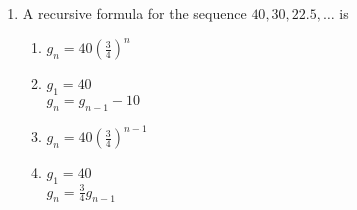 \documentclass[12pt, twoside]{article}
\begin{document}
\begin{enumerate}[itemsep=0.5cm]
\item A recursive formula for the sequence $40, 30, 22.5, \ldots$ is
\begin{enumerate}
    \item $g_n = 40 \left( \frac{3}{4} \right)^n$
    \item $g_1 = 40$ \\ $g_n = g_{n-1} -10$
    \item $g_n = 40 \left( \frac{3}{4} \right)^{n-1}$
    \item $g_1 = 40$ \\ $g_n = \frac{3}{4} g_{n-1}$
\end{enumerate}

\end{enumerate}
\end{document}
